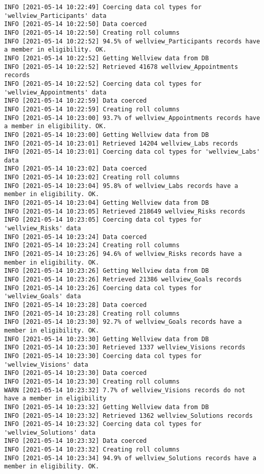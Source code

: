 \documentclass[
]{book}
\begin{document}
\begin{verbatim}
INFO [2021-05-14 10:22:49] Coercing data col types for 'wellview_Participants' data
INFO [2021-05-14 10:22:50] Data coerced
INFO [2021-05-14 10:22:50] Creating roll columns
INFO [2021-05-14 10:22:52] 94.5% of wellview_Participants records have a member in eligibility. OK.
INFO [2021-05-14 10:22:52] Getting Wellview data from DB
INFO [2021-05-14 10:22:52] Retrieved 41678 wellview_Appointments records
INFO [2021-05-14 10:22:52] Coercing data col types for 'wellview_Appointments' data
INFO [2021-05-14 10:22:59] Data coerced
INFO [2021-05-14 10:22:59] Creating roll columns
INFO [2021-05-14 10:23:00] 93.7% of wellview_Appointments records have a member in eligibility. OK.
INFO [2021-05-14 10:23:00] Getting Wellview data from DB
INFO [2021-05-14 10:23:01] Retrieved 14204 wellview_Labs records
INFO [2021-05-14 10:23:01] Coercing data col types for 'wellview_Labs' data
INFO [2021-05-14 10:23:02] Data coerced
INFO [2021-05-14 10:23:02] Creating roll columns
INFO [2021-05-14 10:23:04] 95.8% of wellview_Labs records have a member in eligibility. OK.
INFO [2021-05-14 10:23:04] Getting Wellview data from DB
INFO [2021-05-14 10:23:05] Retrieved 218649 wellview_Risks records
INFO [2021-05-14 10:23:05] Coercing data col types for 'wellview_Risks' data
INFO [2021-05-14 10:23:24] Data coerced
INFO [2021-05-14 10:23:24] Creating roll columns
INFO [2021-05-14 10:23:26] 94.6% of wellview_Risks records have a member in eligibility. OK.
INFO [2021-05-14 10:23:26] Getting Wellview data from DB
INFO [2021-05-14 10:23:26] Retrieved 21386 wellview_Goals records
INFO [2021-05-14 10:23:26] Coercing data col types for 'wellview_Goals' data
INFO [2021-05-14 10:23:28] Data coerced
INFO [2021-05-14 10:23:28] Creating roll columns
INFO [2021-05-14 10:23:30] 92.7% of wellview_Goals records have a member in eligibility. OK.
INFO [2021-05-14 10:23:30] Getting Wellview data from DB
INFO [2021-05-14 10:23:30] Retrieved 1337 wellview_Visions records
INFO [2021-05-14 10:23:30] Coercing data col types for 'wellview_Visions' data
INFO [2021-05-14 10:23:30] Data coerced
INFO [2021-05-14 10:23:30] Creating roll columns
WARN [2021-05-14 10:23:32] 7.7% of wellview_Visions records do not have a member in eligibility
INFO [2021-05-14 10:23:32] Getting Wellview data from DB
INFO [2021-05-14 10:23:32] Retrieved 1362 wellview_Solutions records
INFO [2021-05-14 10:23:32] Coercing data col types for 'wellview_Solutions' data
INFO [2021-05-14 10:23:32] Data coerced
INFO [2021-05-14 10:23:32] Creating roll columns
INFO [2021-05-14 10:23:34] 94.9% of wellview_Solutions records have a member in eligibility. OK.

\end{verbatim}
\end{document}
